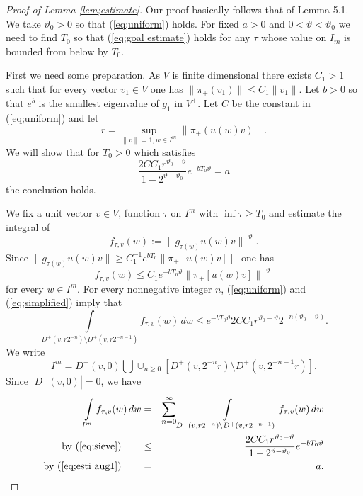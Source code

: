 \documentclass[12pt]{amsart}
\theoremstyle{definition}
\theoremstyle{remark}
\numberwithin{equation}{section}
\begin{document}
\begin{proof}[Proof of Lemma \ref{lem;estimate}]
Our proof basically follows that of  \cite{emm98} Lemma 5.1. 
We take  $\vartheta_0>0$ so that (\ref{eq;uniform}) holds. 
For fixed  $a>0$ and $0<\vartheta<\vartheta_0$  we need to find  $T_0$ 
so that (\ref{eq;goal estimate}) holds for any $\tau$ whose value on $I_m$
is bounded from below by $T_0$. 

First we need some preparation.
As $V$ is finite dimensional there exists $C_1>1$ such that for every vector $v_1\in V$ one has
$\|\pi_+(v_1)\| \le C_1\|v_1\|$. Let $b>0$ so that 
 $e^b$ is the smallest eigenvalue of $g_1$ in $V^+$.
Let $C$
 be the constant in (\ref{eq;uniform}) and let
 \[
 r=\sup_{\|v\|=1, w\in I^m} \|\pi_+(u(w)v)\|.
 \]
 We will show that  for $T_0>0$ which satisfies
 \begin{equation}\label{eq;esti aug1}
\frac{2CC_1r^{\vartheta_0-\vartheta}}{1-2^{\vartheta-\vartheta_0}}e^{-bT_0\vartheta} =a
 \end{equation}
the conclusion holds.

We fix a unit vector $v\in V$, function $\tau$ on $I^m$ with $\inf \tau \ge T_0$ and estimate the integral of 
\[
{f_{\tau,v}(w):=\|g_{\tau(w)}u(w)v\|^{-\vartheta}}.
\]  
Since 
  $
\|g_{\tau(w)}u(w)v\|\ge C_1^{-1} e^{bT_0}\| \pi_+[u(w)v]\|
$
one has   
\begin{equation}\label{eq;simplified}
f_{\tau,v}(w)\le C_1e^{-bT_0\vartheta}\| \pi_+[u(w)v]\|^{-\vartheta}
\end{equation}
 for every $w\in I^m$.
For every nonnegative integer $n$, 
 (\ref{eq;uniform}) and (\ref{eq;simplified}) imply  that
\begin{equation}\label{eq;sieve}
\int\limits_{D^+(v, r2^{-n})\setminus D^+(v, r2^{-n-1})}f_{\tau,v}(w)\, dw\le e^{-bT_0\vartheta}2CC_1r^{\vartheta_0-\vartheta}2^{-n(\vartheta_0-\vartheta)}.
\end{equation}
We write 
\[
I^m=D^+(v, 0)\bigcup\cup_{n\ge 0}[ D^+(v,2^{-n}r)\setminus D^+(v, 2^{-n-1}r)].
\]
Since $|D^+(v, 0)|=0$, we have
\begin{eqnarray*}
\int\limits_{I^m}f_{\tau,v}(w)\, dw  & = &\sum_{n=0}^\infty\int\limits_{D^+(v, r2^{-n})\setminus D^+(v, r2^{-n-1})}f_{\tau, v}(w)\, dw \\
\mbox{by (\ref{eq;sieve})}\qquad&\le & 
\frac{2CC_1r^{\vartheta_0-\vartheta}}{1-2^{\vartheta-\vartheta_0}}e^{-bT_0\vartheta} \\
\mbox{by (\ref{eq;esti aug1})}\qquad & = & a.
\end{eqnarray*}
\end{proof}
\end{document}
